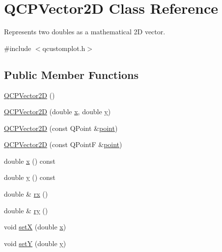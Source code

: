 \hypertarget{class_q_c_p_vector2_d}{}\section{Q\+C\+P\+Vector2D Class Reference}
\label{class_q_c_p_vector2_d}


Represents two doubles as a mathematical 2D vector.  




{\ttfamily \#include $<$qcustomplot.\+h$>$}

\subsection*{Public Member Functions}
\begin{DoxyCompactItemize}
\item 
\mbox{\hyperlink{class_q_c_p_vector2_d_a04c90748c3623044c79fa20788ffbcc6}{Q\+C\+P\+Vector2D}} ()
\item 
\mbox{\hyperlink{class_q_c_p_vector2_d_a47bd86cebc5588dad6ec84349d9098d4}{Q\+C\+P\+Vector2D}} (double \mbox{\hyperlink{class_q_c_p_vector2_d_a4a099e1f9788d52cb46deb8139aa6195}{x}}, double \mbox{\hyperlink{class_q_c_p_vector2_d_a6398fb643ba380d7961a4b208f4eecf1}{y}})
\item 
\mbox{\hyperlink{class_q_c_p_vector2_d_ad8f30a064dc37c90a7ba5e6732ceb5bb}{Q\+C\+P\+Vector2D}} (const Q\+Point \&\mbox{\hyperlink{diffusion_8cpp_a380468221cb8294f9329d11c99c4da30}{point}})
\item 
\mbox{\hyperlink{class_q_c_p_vector2_d_a3c16eba1006c210ffc3299253fef2339}{Q\+C\+P\+Vector2D}} (const Q\+PointF \&\mbox{\hyperlink{diffusion_8cpp_a380468221cb8294f9329d11c99c4da30}{point}})
\item 
double \mbox{\hyperlink{class_q_c_p_vector2_d_a4a099e1f9788d52cb46deb8139aa6195}{x}} () const
\item 
double \mbox{\hyperlink{class_q_c_p_vector2_d_a6398fb643ba380d7961a4b208f4eecf1}{y}} () const
\item 
double \& \mbox{\hyperlink{class_q_c_p_vector2_d_a1516252dac9eb5ffb7ddb17fb26e60e0}{rx}} ()
\item 
double \& \mbox{\hyperlink{class_q_c_p_vector2_d_aa8f59a5b54aec8be8e4d1f39db892fea}{ry}} ()
\item 
void \mbox{\hyperlink{class_q_c_p_vector2_d_ab4249e6ce7bfc37be56f014c54b761ae}{setX}} (double \mbox{\hyperlink{class_q_c_p_vector2_d_a4a099e1f9788d52cb46deb8139aa6195}{x}})
\item 
void \mbox{\hyperlink{class_q_c_p_vector2_d_ada288019aa8cd51e3b30acfc07b461dc}{setY}} (double \mbox{\hyperlink{class_q_c_p_vector2_d_a6398fb643ba380d7961a4b208f4eecf1}{y}})

\end{DoxyCompactItemize}
